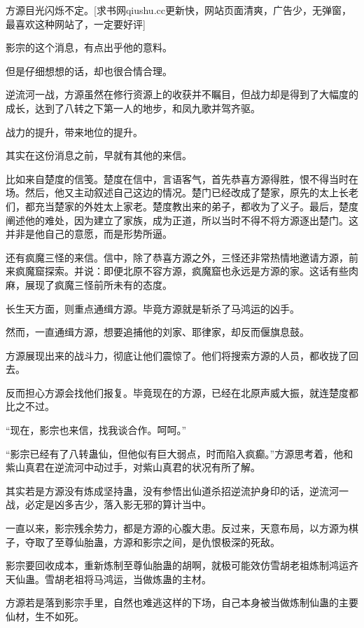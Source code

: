 
\begin{this_body}

方源目光闪烁不定。[求书网qiushu.cc更新快，网站页面清爽，广告少，无弹窗，最喜欢这种网站了，一定要好评]

影宗的这个消息，有点出乎他的意料。

但是仔细想想的话，却也很合情合理。

逆流河一战，方源虽然在修行资源上的收获并不瞩目，但战力却是得到了大幅度的成长，达到了八转之下第一人的地步，和凤九歌并驾齐驱。

战力的提升，带来地位的提升。

其实在这份消息之前，早就有其他的来信。

比如来自楚度的信笺。楚度在信中，言语客气，首先恭喜方源得胜，恨不得当时在场。然后，他又主动叙述自己这边的情况。楚门已经改成了楚家，原先的太上长老们，都充当楚家的外姓太上家老。楚度教出来的弟子，都收为了义子。最后，楚度阐述他的难处，因为建立了家族，成为正道，所以当时不得不将方源逐出楚门。这并非是他自己的意愿，而是形势所逼。

还有疯魔三怪的来信。信中，除了恭喜方源之外，三怪还非常热情地邀请方源，前来疯魔窟探索。并说：即便北原不容方源，疯魔窟也永远是方源的家。这话有些肉麻，展现了疯魔三怪前所未有的态度。

长生天方面，则重点通缉方源。毕竟方源就是斩杀了马鸿运的凶手。

然而，一直通缉方源，想要追捕他的刘家、耶律家，却反而偃旗息鼓。

方源展现出来的战斗力，彻底让他们震惊了。他们将搜索方源的人员，都收拢了回去。

反而担心方源会找他们报复。毕竟现在的方源，已经在北原声威大振，就连楚度都比之不过。

“现在，影宗也来信，找我谈合作。呵呵。”

“影宗已经有了八转蛊仙，但他似有巨大弱点，时而陷入疯癫。”方源思考着，他和紫山真君在逆流河中动过手，对紫山真君的状况有所了解。

其实若是方源没有炼成坚持蛊，没有参悟出仙道杀招逆流护身印的话，逆流河一战，必定是凶多吉少，落入影无邪的算计当中。

一直以来，影宗残余势力，都是方源的心腹大患。反过来，天意布局，以方源为棋子，夺取了至尊仙胎蛊，方源和影宗之间，是仇恨极深的死敌。

影宗要回收成本，重新炼制至尊仙胎蛊的胡啊，就极可能效仿雪胡老祖炼制鸿运齐天仙蛊。雪胡老祖将马鸿运，当做炼蛊的主材。

方源若是落到影宗手里，自然也难逃这样的下场，自己本身被当做炼制仙蛊的主要仙材，生不如死。


\end{this_body}
